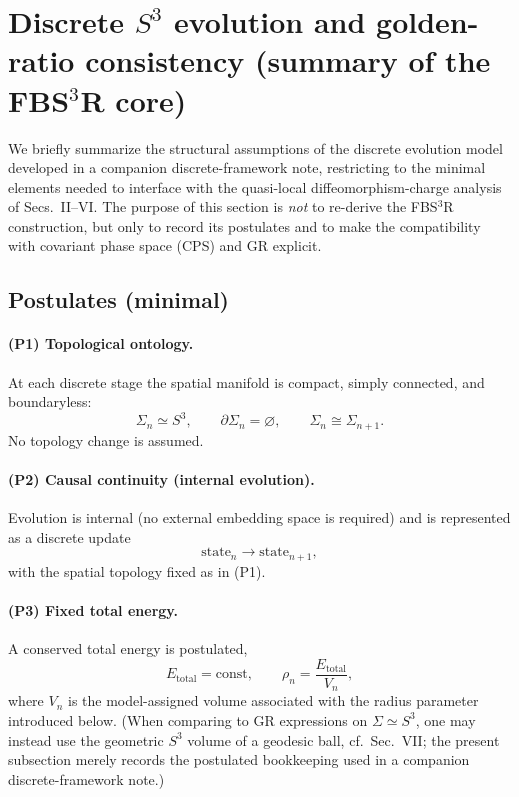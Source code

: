 \documentclass[
  reprint,
  amsmath,amssymb,
  aps,
  prd,
  superscriptaddress,
  nofootinbib,
  longbibliography
]{revtex4-2}
\newcommand{\Sthree}{\ensuremath{S^3}}
\begin{document}
\section{Discrete \texorpdfstring{$\Sthree$}{S3} evolution and golden-ratio consistency (summary of the FBS$^{3}$R core)}
\label{sec:FBS3Rbridge}
We briefly summarize the structural assumptions of the discrete evolution model developed in a companion discrete-framework note,
restricting to the minimal elements needed to interface with the quasi-local diffeomorphism-charge analysis of
Secs.~II--VI. The purpose of this section is \emph{not} to re-derive the FBS$^{3}$R construction, but only to record its
postulates and to make the compatibility with covariant phase space (CPS) and GR explicit.
\subsection{Postulates (minimal)}
\label{subsec:FBS3Rpostulates}
\paragraph{(P1) Topological ontology.}
At each discrete stage the spatial manifold is compact, simply connected, and boundaryless:
\begin{equation}
\Sigma_n \simeq S^3,
\qquad
\partial\Sigma_n=\varnothing,
\qquad
\Sigma_n \cong \Sigma_{n+1}.
\end{equation}
No topology change is assumed.
\paragraph{(P2) Causal continuity (internal evolution).}
Evolution is internal (no external embedding space is required) and is represented as a discrete update
\begin{equation}
\text{state}_n \rightarrow \text{state}_{n+1},
\end{equation}
with the spatial topology fixed as in (P1).
\paragraph{(P3) Fixed total energy.}
A conserved total energy is postulated,
\begin{equation}
E_{\text{total}}=\text{const},
\qquad
\rho_n=\frac{E_{\text{total}}}{V_n},
\end{equation}
where $V_n$ is the model-assigned volume associated with the radius parameter introduced below.
(When comparing to GR expressions on $\Sigma\simeq S^3$, one may instead use the geometric $S^3$ volume of a
geodesic ball, cf.\ Sec.~VII; the present subsection merely records the postulated bookkeeping used in a companion discrete-framework note.)
\end{document}
